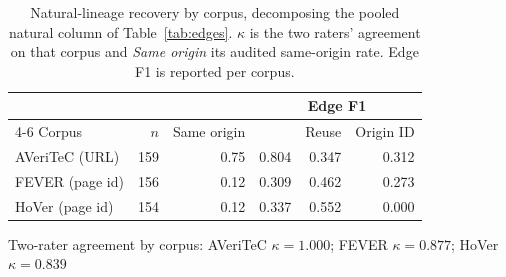\begin{table}[t]
\centering\footnotesize\setlength{\tabcolsep}{3pt}
\caption{Natural-lineage recovery by corpus, decomposing the pooled natural column of Table~\ref{tab:edges}. $\kappa$ is the two raters' agreement on that corpus and \emph{Same origin} its audited same-origin rate. Edge F1 is reported per corpus.}
\label{tab:corpus}
\begin{tabular}{lrrrrr}
\toprule
& & & \multicolumn{3}{c}{Edge F1} \\
\cmidrule(lr){4-6}
Corpus & $n$ & Same origin & \textbf{\system{}} & Reuse & Origin ID \\
\midrule
AVeriTeC (URL) & 159 & 0.75 & 0.804 & 0.347 & 0.312 \\
FEVER (page id) & 156 & 0.12 & 0.309 & 0.462 & 0.273 \\
HoVer (page id) & 154 & 0.12 & 0.337 & 0.552 & 0.000 \\
\bottomrule
\end{tabular}\par\vspace{3pt}
{\footnotesize\raggedright
Two-rater agreement by corpus: AVeriTeC $\kappa=1.000$; FEVER $\kappa=0.877$; HoVer $\kappa=0.839$\par}
\end{table}
